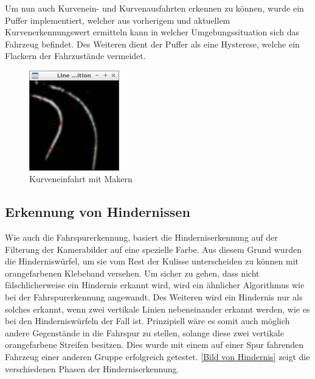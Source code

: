 Um nun auch Kurvenein- und Kurvenausfahrten erkennen zu können, wurde ein Puffer implementiert, welcher aus vorherigem und aktuellem Kurvenerkennungswert ermitteln kann in welcher Umgebungssituation sich das Fahrzeug befindet. Des Weiteren dient der Puffer als eine Hysterese, welche ein Flackern der Fahrzustände vermeidet.

\begin{figure}[ht]
	\centering
	\includegraphics[width=0.35\textwidth]{images/curve_bw.png}
	\caption{Kurveneinfahrt mit Makern}
\end{figure}
\label{Bild von Kurve}

\subsection{Erkennung von Hindernissen}
\label{sec:hinderniserkennung}
Wie auch die Fahrspurerkennung, basiert die Hinderniserkennung auf der Filterung der Kamerabilder auf eine spezielle Farbe. Aus diesem Grund wurden die Hinderniswürfel, um sie vom Rest der Kulisse unterscheiden zu können mit orangefarbenen Klebeband versehen. Um sicher zu gehen, dass nicht fälschlicherweise ein Hindernis erkannt wird, wird ein ähnlicher Algorithmus wie bei der Fahrspurerkennung angewandt. Des Weiteren wird ein Hindernis nur als solches erkannt, wenn zwei vertikale Linien nebeneinander erkannt werden, wie es bei den Hinderniswürfeln der Fall ist. Prinzipiell wäre es somit auch möglich andere Gegenstände in die Fahrspur zu stellen, solange diese zwei vertikale orangefarbene Streifen besitzen. Dies wurde mit einem auf einer Spur fahrenden Fahrzeug einer anderen Gruppe erfolgreich getestet. \autoref{Bild von Hindernis} zeigt die verschiedenen Phasen der Hinderniserkennung.

